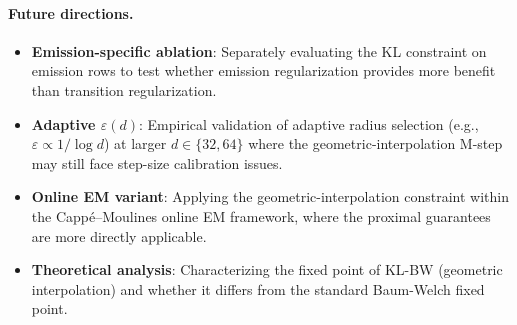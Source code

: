 \documentclass[11pt,letterpaper]{article}
\begin{document}
\paragraph{Future directions.}
\begin{itemize}
  \item \textbf{Emission-specific ablation}: Separately evaluating the KL constraint on emission rows to test whether
  emission regularization provides more benefit than transition regularization.
  \item \textbf{Adaptive $\varepsilon(d)$}: Empirical validation of adaptive radius selection (e.g.,
  $\varepsilon \propto 1/\log d$) at larger $d \in \{32, 64\}$ where the geometric-interpolation M-step may still face
  step-size calibration issues.
  \item \textbf{Online EM variant}: Applying the geometric-interpolation constraint within the Capp\'e--Moulines online
  EM framework, where the proximal guarantees are more directly applicable.
  \item \textbf{Theoretical analysis}: Characterizing the fixed point of KL-BW (geometric interpolation) and whether it
  differs from the standard Baum-Welch fixed point.
\end{itemize}



\end{document}
